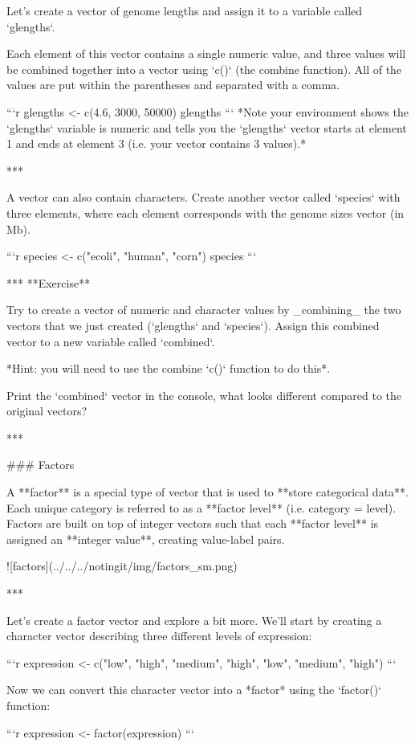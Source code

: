 Let's create a vector of genome lengths and assign it to a variable called `glengths`. 

Each element of this vector contains a single numeric value, and three values will be combined together into a vector using `c()` (the combine function). All of the values are put within the parentheses and separated with a comma.


```r
glengths <- c(4.6, 3000, 50000)
glengths
```
*Note your environment shows the `glengths` variable is numeric and tells you the `glengths` vector starts at element 1 and ends at element 3 (i.e. your vector contains 3 values).*

***

A vector can also contain characters. Create another vector called `species` with three elements, where each element corresponds with the genome sizes vector (in Mb).

```r
species <- c("ecoli", "human", "corn")
species
```

***
**Exercise**

Try to create a vector of numeric and character values by _combining_ the two vectors that we just created (`glengths` and `species`). Assign this combined vector to a new variable called `combined`. 

*Hint: you will need to use the combine `c()` function to do this*. 

Print the `combined` vector in the console, what looks different compared to the original vectors?

***

### Factors

A **factor** is a special type of vector that is used to **store categorical data**. Each unique category is referred to as a **factor level** (i.e. category = level). Factors are built on top of integer vectors such that each **factor level** is assigned an **integer value**, creating value-label pairs. 

![factors](../../../notingit/img/factors_sm.png)

***

Let's create a factor vector and explore a bit more.  We'll start by creating a character vector describing three different levels of expression:

```r
expression <- c("low", "high", "medium", "high", "low", "medium", "high")
```

Now we can convert this character vector into a *factor* using the `factor()` function:

```r
expression <- factor(expression)
```


